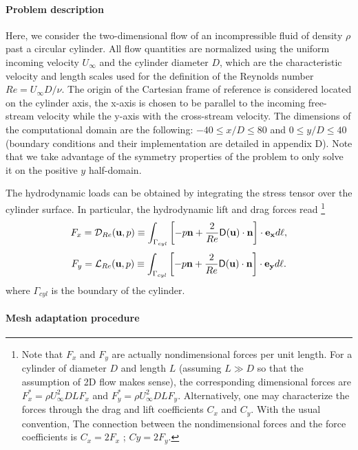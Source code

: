 \documentclass[twocolumn,10pt]{asme2ej}
\newcommand{\be}[1]{ \begin{equation} \label{#1}}
\newcommand{\ee}{\end{equation}}
\begin{document}
\paragraph{Problem description}
Here, we consider the two-dimensional flow of an incompressible fluid of density $\rho$ past a circular cylinder. 
All flow quantities are normalized using the uniform incoming velocity $U_{\infty}$ and the cylinder diameter $D$, which are the characteristic velocity and length scales used for the definition of the Reynolds number $Re= U_{\infty} D / \nu$.
The origin of the Cartesian frame of reference is considered located on the cylinder axis, the x-axis is chosen to be parallel to the incoming free-stream velocity while the y-axis with the cross-stream velocity. The dimensions of the computational domain are the following: $-40 \le x/D \le 80$ and $0 \le y/D \le 40$ (boundary conditions and their implementation are detailed in appendix D).
Note that we take advantage of the symmetry properties of the problem to only solve it on the positive $y$ half-domain. 

The hydrodynamic loads can be obtained by integrating the stress tensor over the cylinder surface.
In particular, the hydrodynamic lift and drag forces read
\footnote{ Note that $F_x$ and $F_y$ are actually nondimensional forces per unit length. 
For a cylinder of diameter $D$ and length $L$ (assuming $L\gg D$ so that the assumption of 2D flow makes sense), 
the corresponding dimensional forces are $F_x^* = \rho U_\infty^2 D L F_x $ and $F_y^* = \rho U_\infty^2 D L F_y$. 
Alternatively, one may characterize the forces through the drag and lift coefficients $C_x$ and $C_y$. With the usual convention, 
The connection between the nondimensional forces and the force coefficients is $C_x = 2 F_x$ ; $Cy = 2 F_y$.
}
\be{drag}
F_x = {\cal D}_{Re} ({\bf u},p) \equiv 
  \int_{\Gamma_{cyl}} \left[-p {\bf n} + \frac{2}{Re} {\mathsf{D}}({\bf u}) \cdot {\bf n} \right]   \cdot {\bf e_x} d\ell,
\ee
\be{lift}
F_y = {\cal L}_{Re} ({\bf u},p) \equiv
  \int_{\Gamma_{cyl}} \left[-p {\bf n} + \frac{2}{Re} {\mathsf{D}}({\bf u}) \cdot {\bf n} \right]   \cdot {\bf e_y} d\ell. 
\ee
where $\Gamma_{cyl}$ is the boundary of the cylinder. %


\paragraph{Mesh adaptation procedure}
\end{document}
